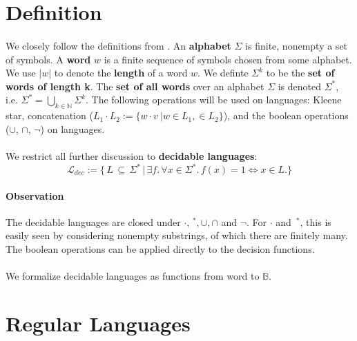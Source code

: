 \documentclass[11pt,a4paper,oneside]{book}
\begin{document}
    \section{Definition}
        \paragraph{}
        We closely follow the definitions from \cite{DBLP:books/daglib/0011126}.
        An \textbf{alphabet} $\Sigma$ is finite, nonempty a set of symbols. 
        A \textbf{word} $w$ is a finite sequence of symbols chosen from some alphabet. 
        We use $|w|$ to denote the \textbf{length} of a word $w$. 
        We definte $\Sigma^k$ to be the \textbf{set of words of length k}.
        The \textbf{set of all words} over an alphabet $\Sigma$ is denoted $\Sigma^*$, i.e. $\Sigma^* = \bigcup_{k \in \mathbb{N}} \Sigma^k$.
        The following operations will be used on languages: Kleene star, concatenation ($L_1 \cdot L_2 := \{w \cdot v\ \vert w \in L_1,  \in L_2\}$), and the boolean operations ($\cup$, $\cap$, $\neg$) on languages.

        
        \paragraph{} We restrict all further discussion to \textbf{decidable languages}:
        \[
            \mathcal{L}_{dec} := \{ \, L \, \subseteq \, \Sigma^* \, 
                \vert \, \exists f. \, \forall x \in \Sigma^*. \, f(x) = 1 \Leftrightarrow  x \in L. \}
        \] 

        \paragraph{Observation} 
            The decidable languages are closed under $\cdot, \,^*, \cup, \cap$ and $\neg$. 
            For $\cdot$ and $\,^*$, this is easily seen by considering nonempty substrings, of which there are finitely many. 
            The boolean operations can be applied directly to the decision functions.

        \paragraph{} 
            We formalize decidable languages as functions from word to $\mathbb{B}$.

        \section{Regular Languages}
        
\end{document}
